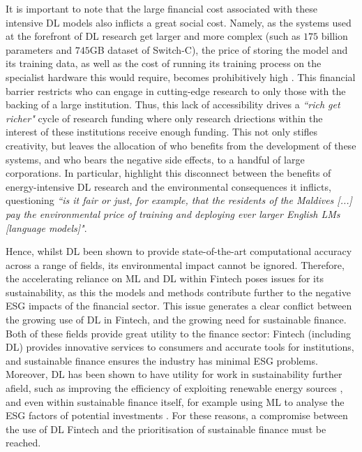 \documentclass[a4paper, 11pt]{report}
\begin{document}
    It is important to note that the large financial cost associated with these intensive DL models also inflicts a great social cost. Namely, as the systems used at the forefront of DL research get larger and more complex (such as $175$ billion parameters and $745$GB dataset of  Switch-C), the price of storing the model and its training data, as well as the cost of running its training process on the specialist hardware this would require, becomes prohibitively high \citep{schwartz-2019}. This financial barrier restricts who can engage in cutting-edge research to only those with the backing of a large institution. Thus, this lack of accessibility drives a \emph{``rich get richer"} cycle of research funding \citep{strubell-2019} where only research driections within the interest of these institutions receive enough funding. This not only stifles creativity, but leaves the allocation of who benefits from the development of these systems, and who bears the negative side effects, to a handful of large corporations. In particular, \citet{bender-2021} highlight this disconnect between the benefits of energy-intensive DL research and the environmental consequences it inflicts, questioning \emph{``is it fair or just, for example, that the residents of the Maldives [...] pay the environmental price of training and deploying ever larger English LMs [language models]"}.

    Hence, whilst DL been shown to provide state-of-the-art computational accuracy across a range of fields, its environmental impact cannot be ignored. Therefore, the accelerating reliance on ML and DL within Fintech poses issues for its sustainability, as this the models and methods contribute further to the negative ESG impacts of the financial sector. This issue generates a clear conflict between the growing use of DL in Fintech, and the growing need for sustainable finance. Both of these fields provide great utility to the finance sector: Fintech (including DL) provides innovative services to consumers and accurate tools for institutions, and sustainable finance ensures the industry has minimal ESG problems. Moreover, DL has been shown to have utility for work in sustainability further afield, such as improving the efficiency of exploiting renewable energy sources \citep{daniel-2021}, and even within sustainable finance itself, for example using ML to analyse the ESG factors of potential investments \citep{mehra-2022}. For these reasons, a compromise between the use of DL Fintech and the prioritisation of sustainable finance must be reached. 
\end{document}

